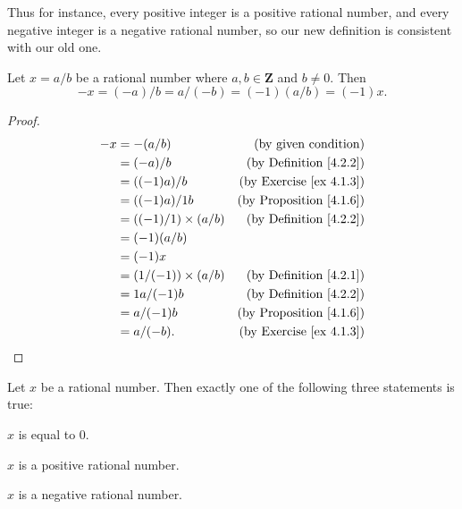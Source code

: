 \begin{note}
    Thus for instance, every positive integer is a positive rational number, and every negative integer is a negative rational number, so our new definition is consistent with our old one.
\end{note}

\begin{additional corollary}\label{ac 4.2.3}
Let \(x = a / b\) be a rational number where \(a, b \in \mathbf{Z}\) and \(b \neq 0\).
Then
\[
    -x = (-a) / b = a / (-b) = (-1)(a / b) = (-1)x.
\]
\end{additional corollary}

\begin{proof}
    \begin{align*}
        -x & = -(a / b)                  & \text{(by given condition)}         \\
           & = (-a) / b                  & \text{(by Definition \ref{4.2.2})}  \\
           & = ((-1)a) / b               & \text{(by Exercise \ref{ex 4.1.3})} \\
           & = ((-1)a) / 1b              & \text{(by Proposition \ref{4.1.6})} \\
           & = ((-1) / 1) \times (a / b) & \text{(by Definition \ref{4.2.2})}  \\
           & = (-1)(a / b)                                                     \\
           & = (-1)x                                                           \\
           & = (1 / (-1)) \times (a / b) & \text{(by Definition \ref{4.2.1})}  \\
           & = 1a / (-1)b                & \text{(by Definition \ref{4.2.2})}  \\
           & = a / (-1)b                 & \text{(by Proposition \ref{4.1.6})} \\
           & = a / (-b).                 & \text{(by Exercise \ref{ex 4.1.3})}
    \end{align*}
\end{proof}

\begin{lemma}\label{4.2.7}
    Let \(x\) be a rational number.
    Then exactly one of the following three statements is true:
    \begin{enumerate*}
        \item \(x\) is equal to \(0\).
        \item \(x\) is a positive rational number.
        \item \(x\) is a negative rational number.
    \end{enumerate*}
\end{lemma}

